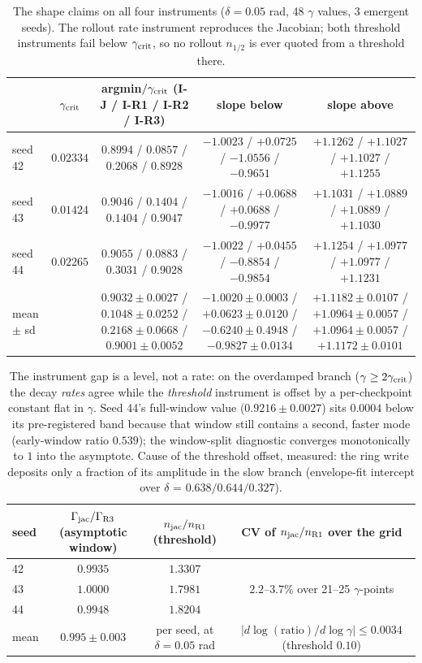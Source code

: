 \documentclass{article}
\begin{document}
\begin{table}[!htb]\centering\small
\caption{The shape claims on all four instruments ($\delta=0.05$ rad, 48 $\gamma$ values, 3 emergent seeds). The rollout rate instrument reproduces the Jacobian; both threshold instruments fail below $\gamma_{\rm crit}$, so no rollout $n_{1/2}$ is ever quoted from a threshold there.}
\begin{tabular}{lcccc}
\toprule
 & $\gamma_{\rm crit}$ & argmin$/\gamma_{\rm crit}$ (I-J / I-R1 / I-R2 / I-R3) & slope below & slope above\\
\midrule
seed 42 & $0.02334$ & $0.8994$ / $0.0857$ / $0.2068$ / $0.8928$ & $-1.0023$ / $+0.0725$ / $-1.0556$ / $-0.9651$ & $+1.1262$ / $+1.1027$ / $+1.1027$ / $+1.1255$\\
seed 43 & $0.01424$ & $0.9046$ / $0.1404$ / $0.1404$ / $0.9047$ & $-1.0016$ / $+0.0688$ / $+0.0688$ / $-0.9977$ & $+1.1031$ / $+1.0889$ / $+1.0889$ / $+1.1030$\\
seed 44 & $0.02265$ & $0.9055$ / $0.0883$ / $0.3031$ / $0.9028$ & $-1.0022$ / $+0.0455$ / $-0.8854$ / $-0.9854$ & $+1.1254$ / $+1.0977$ / $+1.0977$ / $+1.1231$\\
\midrule
mean $\pm$ sd & & $0.9032\pm0.0027$ / $0.1048\pm0.0252$ / $0.2168\pm0.0668$ / $0.9001\pm0.0052$ & $-1.0020\pm0.0003$ / $+0.0623\pm0.0120$ / $-0.6240\pm0.4948$ / $-0.9827\pm0.0134$ & $+1.1182\pm0.0107$ / $+1.0964\pm0.0057$ / $+1.0964\pm0.0057$ / $+1.1172\pm0.0101$\\
\bottomrule
\end{tabular}
\end{table}

\begin{table}[!htb]\centering\small
\caption{The instrument gap is a level, not a rate: on the overdamped branch ($\gamma\ge2\gamma_{\rm crit}$) the decay \emph{rates} agree while the \emph{threshold} instrument is offset by a per-checkpoint constant flat in $\gamma$. Seed 44's full-window value ($0.9216\pm0.0027$) sits $0.0004$ below its pre-registered band because that window still contains a second, faster mode (early-window ratio $0.539$); the window-split diagnostic converges monotonically to $1$ into the asymptote. Cause of the threshold offset, measured: the ring write deposits only a fraction of its amplitude in the slow branch (envelope-fit intercept over $\delta$ = $0.638/0.644/0.327$).}
\begin{tabular}{lccc}
\toprule
seed & $\Gamma_{\rm jac}/\Gamma_{\rm R3}$ (asymptotic window) & $n_{\rm jac}/n_{\rm R1}$ (threshold) & CV of $n_{\rm jac}/n_{\rm R1}$ over the grid\\
\midrule
42 & $0.9935$ & $1.3307$ & \multirow{3}{*}{$2.2$--$3.7\%$ over 21--25 $\gamma$-points}\\
43 & $1.0000$ & $1.7981$ & \\
44 & $0.9948$ & $1.8204$ & \\
\midrule
mean & $0.995\pm0.003$ & per seed, at $\delta=0.05$ rad & $|d\log(\text{ratio})/d\log\gamma|\le0.0034$ (threshold $0.10$)\\
\bottomrule
\end{tabular}
\end{table}
\end{document}

